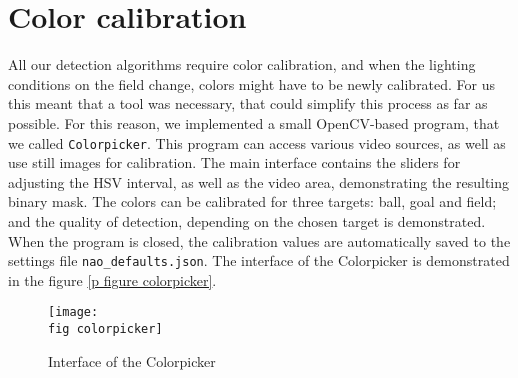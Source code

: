 \section{Color calibration}

All our detection algorithms require color calibration, and when the lighting
conditions on the field change, colors might have to be newly calibrated. For
us this meant that a tool was necessary, that could simplify this process as
far as possible. For this reason, we implemented a small OpenCV-based program,
that we called \verb|Colorpicker|. This program can access various video
sources, as well as use still images for calibration. The main interface
contains the sliders for adjusting the HSV interval, as well as the video area,
demonstrating the resulting binary mask. The colors can be calibrated for three
targets: ball, goal and field; and the quality of detection, depending on the
chosen target is demonstrated. When the program is closed, the calibration
values are automatically saved to the settings file \verb|nao_defaults.json|.
The interface of the Colorpicker is demonstrated in the figure \ref{p figure
  colorpicker}.

\begin{figure}[ht]
  \texttt{[image: \\fig colorpicker]}
  \caption{Interface of the Colorpicker}
  \label{p figure colorpicker}
\end{figure}
